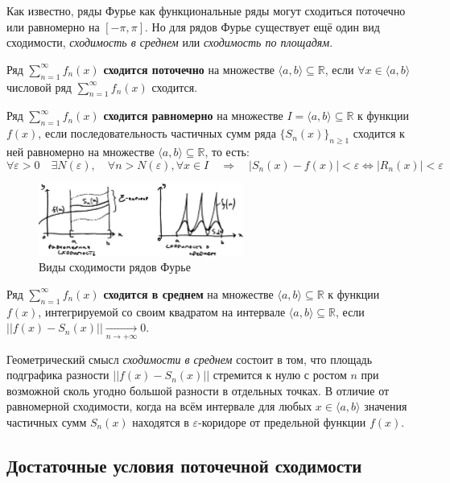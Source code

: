 \documentclass[12pt, a4paper]{article}
\newcommand{\irv}[1]{\langle #1 \rangle}
\begin{document}
Как известно, ряды Фурье как функциональные ряды могут сходиться поточечно или равномерно на $[-\pi, \pi]$. Но для рядов Фурье существует ещё один вид сходимости, \textit{сходимость в среднем} или \textit{сходимость по площадям}.

Ряд $\sum_{n=1}^{\infty} f_n(x)$ \textbf{сходится поточечно} на множестве $\irv{a, b} \subseteq \mathbb{R}$, если $\forall x \in \irv{a, b}$ числовой ряд $\sum_{n=1}^{\infty} f_n(x)$ сходится.

Ряд $\sum_{n=1}^{\infty} f_n(x)$ \textbf{сходится равномерно} на множестве $I = \irv{a, b} \subseteq \mathbb{R}$ к функции $f(x)$, если последовательность частичных сумм ряда $\{S_n(x) \}_{n \geq 1}$ сходится к ней равномерно на множестве $\irv{a, b} \subseteq \mathbb{R}$, то есть:
\[\forall \varepsilon > 0 \quad \exists N(\varepsilon), \quad \forall n>N(\varepsilon), \forall x \in I \quad \Rightarrow \quad |S_n(x) - f(x)|<\varepsilon \Leftrightarrow |R_n(x)|<\varepsilon \]

\begin{figure}[h]
 \centering
 \includegraphics[width=0.6\textwidth]{10}
 \vspace{-4mm}
  \caption{Виды сходимости рядов Фурье}
\end{figure}

Ряд $\sum_{n=1}^{\infty} f_n(x)$ \textbf{сходится в среднем} на множестве $\irv{a, b} \subseteq \mathbb{R}$ к функции $f(x)$, интегрируемой со своим квадратом на интервале $\irv{a, b} \subseteq \mathbb{R}$, если $||f(x) - S_n(x)|| \xrightarrow[n \to +\infty]{} 0 $.

Геометрический смысл \textit{сходимости в среднем} состоит в том, что площадь подграфика разности $||f(x) - S_n(x)||$ стремится к нулю с ростом $n$ при возможной сколь угодно большой разности в отдельных точках. В отличие от равномерной сходимости, когда на всём интервале для любых $x \in \irv{a, b}$ значения частичных сумм $S_n(x)$ находятся в $\varepsilon$-коридоре от предельной функции $f(x)$.

\subsection{Достаточные условия поточечной сходимости}
\end{document}
